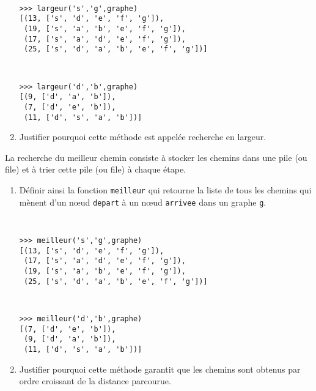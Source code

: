 \begin{question}
\begin{enumerate}
\noindent\begin{minipage}[t]{7cm}\tt\footnotesize
\begin{Verbatim}
>>> largeur('s','g',graphe)
[(13, ['s', 'd', 'e', 'f', 'g']), 
 (19, ['s', 'a', 'b', 'e', 'f', 'g']), 
 (17, ['s', 'a', 'd', 'e', 'f', 'g']), 
 (25, ['s', 'd', 'a', 'b', 'e', 'f', 'g'])]
\end{Verbatim}
\end{minipage}
\hfill
\begin{minipage}[t]{7cm}\tt\footnotesize
\begin{Verbatim}
>>> largeur('d','b',graphe)
[(9, ['d', 'a', 'b']), 
 (7, ['d', 'e', 'b']), 
 (11, ['d', 's', 'a', 'b'])]
\end{Verbatim}
\end{minipage}
\vspace*{2mm}

\item Justifier pourquoi cette méthode est appelée recherche en largeur.
\end{enumerate}
\end{question}

\begin{question}
La recherche du meilleur chemin consiste à stocker les chemins dans une pile 
	(ou file) et à trier cette pile (ou file) à chaque
	étape.
\begin{enumerate}
\item Définir ainsi la fonction \texttt{meilleur} qui retourne la liste 
		de tous les chemins qui mènent d'un n\oe ud \texttt{depart} à un 
		n\oe ud \texttt{arrivee} dans un graphe	\texttt{g}.

\noindent\begin{minipage}[t]{7cm}\tt\footnotesize
\begin{Verbatim}
>>> meilleur('s','g',graphe)
[(13, ['s', 'd', 'e', 'f', 'g']), 
 (17, ['s', 'a', 'd', 'e', 'f', 'g']), 
 (19, ['s', 'a', 'b', 'e', 'f', 'g']), 
 (25, ['s', 'd', 'a', 'b', 'e', 'f', 'g'])]
\end{Verbatim}
\end{minipage}
\hfill
\begin{minipage}[t]{7cm}\tt\footnotesize
\begin{Verbatim}
>>> meilleur('d','b',graphe)
[(7, ['d', 'e', 'b']), 
 (9, ['d', 'a', 'b']), 
 (11, ['d', 's', 'a', 'b'])]
\end{Verbatim}
\end{minipage}
\vspace*{2mm}

\item Justifier pourquoi cette méthode garantit que les chemins sont obtenus
		par ordre croissant de la distance parcourue.
\end{enumerate}

\end{question}

